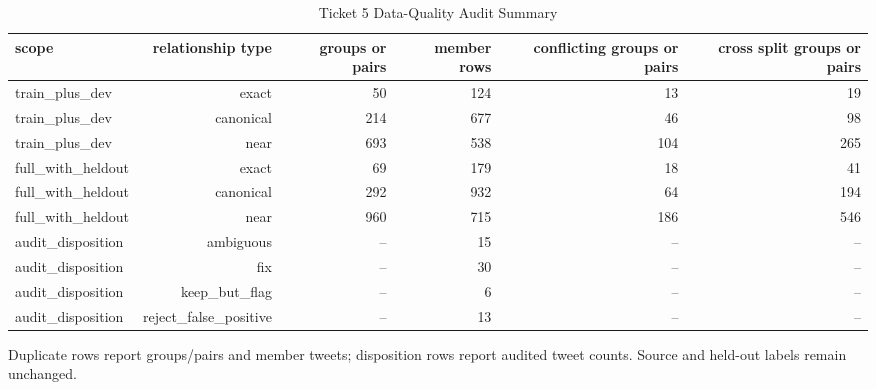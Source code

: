 \begin{table}[t]
\centering
\caption{Ticket 5 Data-Quality Audit Summary}
\label{tab:data_quality}
\begin{adjustbox}{max width=\textwidth}
\scriptsize
\begin{tabular}{lrrrrr}
\hline
scope & relationship type & groups or pairs & member rows & conflicting groups or pairs & cross split groups or pairs \\
\hline
train\_plus\_dev & exact & 50 & 124 & 13 & 19 \\
train\_plus\_dev & canonical & 214 & 677 & 46 & 98 \\
train\_plus\_dev & near & 693 & 538 & 104 & 265 \\
full\_with\_heldout & exact & 69 & 179 & 18 & 41 \\
full\_with\_heldout & canonical & 292 & 932 & 64 & 194 \\
full\_with\_heldout & near & 960 & 715 & 186 & 546 \\
audit\_disposition & ambiguous & -- & 15 & -- & -- \\
audit\_disposition & fix & -- & 30 & -- & -- \\
audit\_disposition & keep\_but\_flag & -- & 6 & -- & -- \\
audit\_disposition & reject\_false\_positive & -- & 13 & -- & -- \\
\hline
\end{tabular}
\end{adjustbox}
\par\footnotesize{Duplicate rows report groups/pairs and member tweets; disposition rows report audited tweet counts. Source and held-out labels remain unchanged.}
\end{table}
